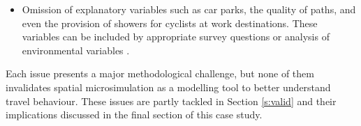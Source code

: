 \begin{itemize}
{specialist software, which is not supplied with the product, but which is
available from intermediary organisations (for more information contact Census
Customer Services).''
}
Also, undertaking network analysis of roads, railways, and walkways (see
Fig.~\ref{fig:agent} for an example) for all individuals could allow more
accurate estimates of route distance. However, this is computationally
challenging, although increasing feasible \citep{gao2010comparison}.
\item Omission of explanatory variables such as car parks, the quality of paths,
and even the provision of showers for cyclists at work destinations. These
variables can be included by appropriate survey questions \citep{Buehler2012}
or analysis of environmental variables \citep{Rietveld2004}.
\end{itemize}
Each issue presents a major methodological challenge, but none
of them invalidates spatial microsimulation as a modelling tool to
better understand travel behaviour. These issues are partly tackled in
Section \ref{s:valid} and their implications discussed in the final section of
this case study.

